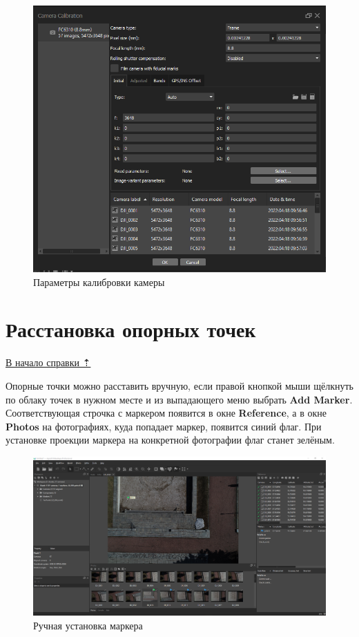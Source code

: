 \documentclass[
  12pt,
]{book}
\begin{document}
\begin{figure}
\centering
\includegraphics{images/Ref18/Camera_Calibration.png}
\caption{Параметры калибровки камеры}
\end{figure}

\hypertarget{agisoft-markers}{%
\section{Расстановка опорных точек}\label{agisoft-markers}}

\protect\hyperlink{agisoft}{В начало справки ⇡}

Опорные точки можно расставить вручную, если правой кнопкой мыши щёлкнуть по облаку точек в нужном месте и из выпадающего меню выбрать \textbf{Add Marker}. Соответствующая строчка с маркером появится в окне \textbf{Reference}, а в окне \textbf{Photos} на фотографиях, куда попадает маркер, появится синий флаг. При установке проекции маркера на конкретной фотографии флаг станет зелёным.

\begin{figure}
\centering
\includegraphics{images/Ref18/Manual_Markers.png}
\caption{Ручная установка маркера}
\end{figure}
\end{document}
